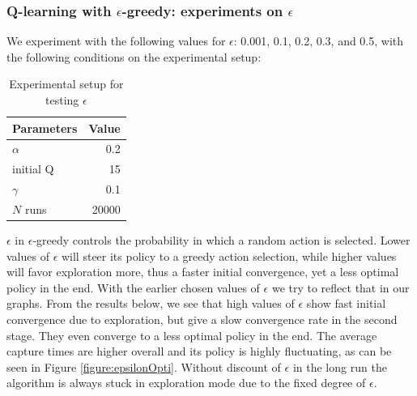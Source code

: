 \documentclass[paper=a4, fontsize=11pt]{scrartcl}
\numberwithin{equation}{section}		%
\numberwithin{figure}{section}			%
\numberwithin{table}{section}				%
\begin{document}
\subsubsection*{Q-learning with $\epsilon$-greedy: experiments on $\epsilon$}
We experiment with the following values for $\epsilon$: 0.001, 0.1, 0.2, 0.3, and 0.5, with the following conditions on the experimental setup:
\begin{table}[H]
\caption{Experimental setup for testing $\epsilon$}
\centering
\begin{tabular}{|l|r|}
\hline
Parameters & Value \\\hline
$\alpha$ & 0.2 \\\hline
initial Q & 15 \\\hline
$\gamma$ & 0.1\\\hline
$N$ runs & 20000\\\hline
\end{tabular}
\label{expSetupEpsilon}
\end{table}
$\epsilon$ in $\epsilon$-greedy controls the probability in which a random action is selected. Lower values of $\epsilon$ will steer its policy to a greedy action selection, while higher values will favor exploration more, thus a faster initial  convergence, yet a less optimal policy in the end. With the earlier chosen values of $\epsilon$ we try to reflect that in our graphs. From the results below, we see that high values of $\epsilon$ show fast initial convergence due to exploration, but give a slow convergence rate in the second stage. They even converge to a less optimal policy in the end. The average capture times are higher overall and its policy is highly fluctuating, as can be seen in Figure \ref{figure:epsilonOpti}. Without discount of $\epsilon$ in the long run the algorithm is always stuck in exploration mode due to the fixed degree of $\epsilon$.
\end{document}
